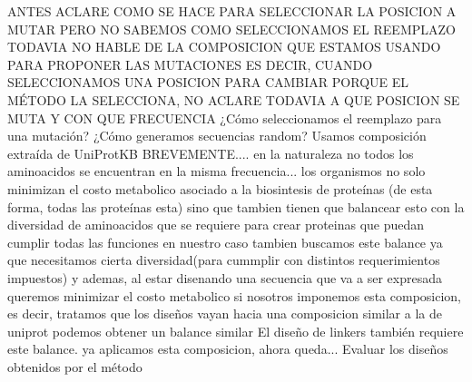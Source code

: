 \documentclass[a4paper,10pt]{article}
\begin{document}
ANTES ACLARE COMO SE HACE PARA SELECCIONAR LA POSICION A MUTAR PERO NO SABEMOS COMO SELECCIONAMOS EL REEMPLAZO
TODAVIA NO HABLE DE LA COMPOSICION QUE ESTAMOS USANDO PARA PROPONER LAS MUTACIONES
ES DECIR, CUANDO SELECCIONAMOS UNA POSICION PARA CAMBIAR PORQUE EL MÉTODO LA SELECCIONA, NO ACLARE TODAVIA A QUE POSICION SE MUTA Y CON QUE FRECUENCIA
  ¿Cómo seleccionamos el reemplazo para una mutación?
 ¿Cómo generamos secuencias random?
 Usamos composición extraída de UniProtKB
  BREVEMENTE.... en la naturaleza no todos  los aminoacidos se encuentran en la misma frecuencia...
los organismos no solo minimizan el costo metabolico asociado a la biosintesis de proteínas (de esta forma, todas las proteínas esta)
sino que tambien tienen que balancear esto con la diversidad de aminoacidos que se requiere para crear proteinas que puedan cumplir todas las funciones
  en nuestro caso tambien buscamos este balance ya que necesitamos cierta diversidad(para cummplir con distintos requerimientos impuestos) 
y ademas, al estar disenando una secuencia que va a ser expresada queremos minimizar el costo metabolico
 si nosotros imponemos esta composicion, es decir, tratamos que los diseños vayan hacia una composicion similar a la de uniprot podemos obtener un balance similar
 El diseño de linkers también requiere este balance. 
 ya aplicamos esta composicion, ahora queda...
 Evaluar los diseños obtenidos por el método
\end{document}
